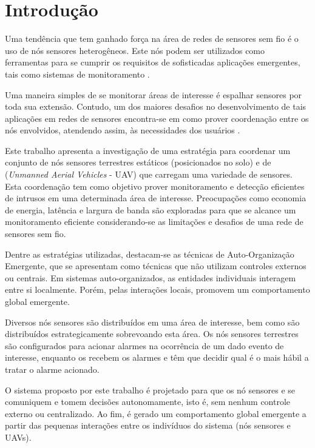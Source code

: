 \section{Introdução}
\label{chap:Introdução}

Uma tendência que tem ganhado força na área de redes de sensores sem fio é o uso
de nós sensores heterogêneos. Este nós podem ser utilizados como ferramentas
para se cumprir os requisitos de sofisticadas aplicações emergentes, tais como
sistemas de monitoramento \cite{Freitas20092}.

Uma maneira simples de se monitorar áreas de interesse é espalhar sensores por
toda sua extensão. Contudo, um dos maiores desafios no desenvolvimento de tais
aplicações em redes de sensores encontra-se em como prover coordenação entre os
nós envolvidos, atendendo assim, às necessidades dos usuários
\cite{Mhatre2005}.

Este trabalho apresenta a investigação de uma estratégia para coordenar um
conjunto de nós sensores terrestres estáticos (posicionados no solo) e de \uavs
(\emph{Unmanned Aerial Vehicles} - UAV) que carregam uma variedade de sensores.
Esta coordenação tem como objetivo prover monitoramento e detecção eficientes de
intrusos em uma determinada área de interesse. Preocupações como economia de
energia, latência e largura de banda são exploradas para que se alcance um
monitoramento eficiente considerando-se as limitações e desafios de uma rede de
sensores sem fio.

Dentre as estratégias utilizadas, destacam-se as técnicas de Auto-Organização
Emergente, que se apresentam como técnicas que não utilizam controles externos
ou centrais. Em sistemas auto-organizados, as entidades individuais interagem
entre si localmente. Porém, pelas interações locais, promovem um comportamento
global emergente.

Diversos nós sensores são distribuídos em uma área de interesse, bem como são
distribuídos estrategicamente \vants sobrevoando esta área. Os nós
sensores terrestres são configurados para acionar alarmes na ocorrência de um
dado evento de interesse, enquanto os
\vants recebem os alarmes e têm que decidir qual \vant é o mais hábil a tratar o
alarme acionado.

O sistema proposto por este trabalho é projetado para que os nó sensores e
\vants se comuniquem e tomem decisões autonomamente, isto é, sem nenhum controle
externo ou centralizado. Ao fim, é gerado um comportamento global emergente a
partir das pequenas interações entre os indivíduos do sistema (nós sensores e
UAVs).


